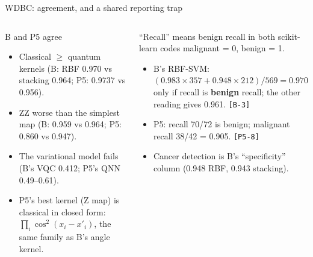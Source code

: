 \documentclass[aspectratio=169,10pt,t,xcolor={table}]{beamer}
\begin{document}
\begin{frame}{WDBC: agreement, and a shared reporting trap}
\begin{columns}[T]
\begin{block}{B and P5 agree}
\footnotesize
\begin{itemize}
  \item Classical $\ge$ quantum kernels (B: RBF 0.970 vs stacking 0.964; P5: 0.9737 vs 0.956).
  \item ZZ worse than the simplest map (B: 0.959 vs 0.964; P5: 0.860 vs 0.947).
  \item The variational model fails (B's VQC 0.412; P5's QNN 0.49--0.61).
  \item P5's best kernel (Z map) is classical in closed form: $\prod_i\cos^2(x_i-x'_i)$, the same family as B's angle kernel.
\end{itemize}
\end{block}
\begin{alertblock}{``Recall'' means benign recall in both}
\footnotesize
scikit-learn codes malignant = 0, benign = 1.
\begin{itemize}
  \item B's RBF-SVM: $(0.983\times357+0.948\times212)/569 = 0.970$ only if recall is \textbf{benign} recall; the other reading gives 0.961. \texttt{[B-3]}
  \item P5: recall 70/72 is benign; malignant recall 38/42 = 0.905. \texttt{[P5-8]}
  \item Cancer detection is B's ``specificity'' column (0.948 RBF, 0.943 stacking).
\end{itemize}
\end{alertblock}
\end{columns}
\end{frame}
\end{document}
